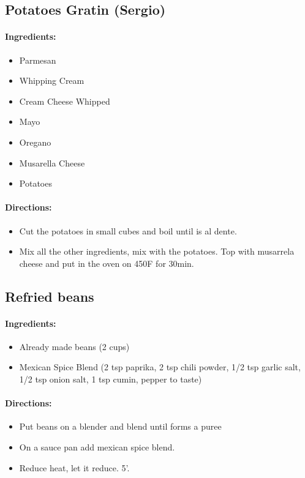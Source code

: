 \documentclass{article}
\begin{document}
\subsection{Potatoes Gratin (Sergio)}

\paragraph{Ingredients:}
\begin{itemize}
    \item Parmesan
    \item Whipping Cream
    \item Cream Cheese Whipped
    \item Mayo
    \item Oregano
    \item Musarella Cheese
    \item Potatoes
\end{itemize}

\paragraph{Directions:}
\begin{itemize}
    \item Cut the potatoes in small cubes and boil until is al dente.
    \item Mix all the other ingredients, mix with the potatoes. Top with musarrela cheese and put in the oven on 450F for 30min.
\end{itemize}

\subsection{Refried beans}

\paragraph{Ingredients:}
\begin{itemize}
    \item Already made beans (2 cups)
    \item Mexican Spice Blend (2 tsp paprika, 2 tsp chili powder, 1/2 tsp garlic salt, 1/2 tsp onion salt, 1 tsp cumin, pepper to taste)
\end{itemize}

\paragraph{Directions:}
\begin{itemize}
    \item Put beans on a blender and blend until forms a puree
    \item On a sauce pan add mexican spice blend.
    \item Reduce heat, let it reduce. 5'.
\end{itemize}
\end{document}
